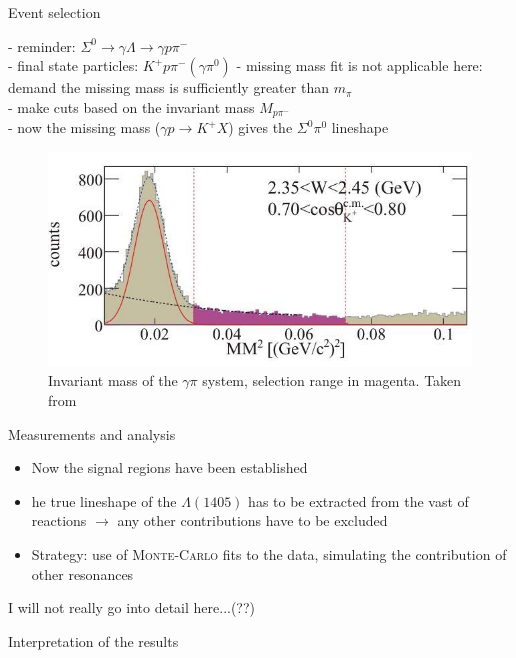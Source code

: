\documentclass[11pt,aspectratio=1610,dvipsnames]{beamer}
\begin{document}
\begin{frame}{Event selection}
	\begin{minipage}{\linewidth}
		\begin{tcolorbox}[colback=black!10,colframe=gray!20!black,title=extracting $\Sigma^0\pi^0$] 
			- reminder: $\Sigma^0\to\gamma\Lambda\to\gamma p \pi^-$\\
			- final state particles: $K^+ p \pi^-(\gamma\pi^0)$
			- missing mass fit is not applicable here: \phantom{- }demand the missing mass is sufficiently greater than $m_\pi$\\
			- make cuts based on the invariant mass $M_{p\pi^-}$\\
			- now the missing mass ($\gamma p\to K^+ X$) gives the $\Sigma^0\pi^0$ lineshape
		\end{tcolorbox}	
	\end{minipage}
\begin{figure}
	\centering
	\includegraphics[width=.5\linewidth]{mism.jpg}
	\caption{Invariant mass of the $\gamma\pi$ system, selection range in magenta. Taken from \citet{lineshapes}}
\end{figure}
\end{frame}




\begin{frame}{Measurements and analysis}
	\begin{itemize}
		\item Now the signal regions have been established
		\item he true lineshape of the $\Lambda(1405)$ has to be extracted from the vast of reactions $\to$ any other contributions have to be excluded
		\item Strategy: use of \textsc{Monte-Carlo} fits to the data, simulating the contribution of other resonances
		
	\end{itemize}
\color{red} I will not really go into detail here...(??)
\end{frame}

\begin{frame}{Interpretation of the results}
	
\end{frame}
\end{document}
